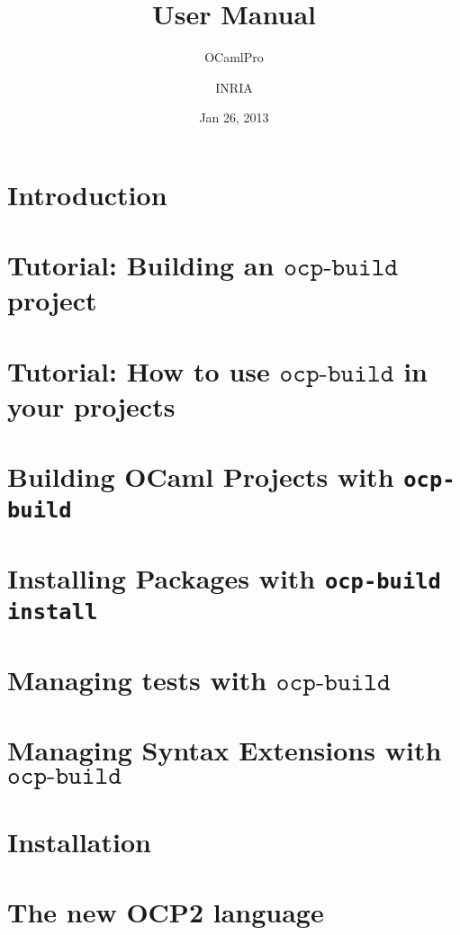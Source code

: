 \documentclass[11pt]{book}
\title{\ocpbuild{} User Manual}
\author{OCamlPro \and INRIA}
\date{Jan 26, 2013}
\newcommand{\cmd}[1]{$\texttt{#1}$}
\newcommand{\ocpbuild}{\cmd{ocp-build}}
\begin{document}
\maketitle
\thispagestyle{empty}
\tableofcontents

\chapter{Introduction}


\chapter{Tutorial: Building an \ocpbuild{} project}


\chapter{Tutorial: How to use \ocpbuild{} in your projects}


\chapter{Building OCaml Projects with {\tt ocp-build}}


\chapter{Installing Packages with {\tt ocp-build install}}


\chapter{Managing tests with \ocpbuild{}}


\chapter{Managing Syntax Extensions with \ocpbuild{}}


\chapter{Installation}


\chapter{The new OCP2 language}


%
\end{document}
